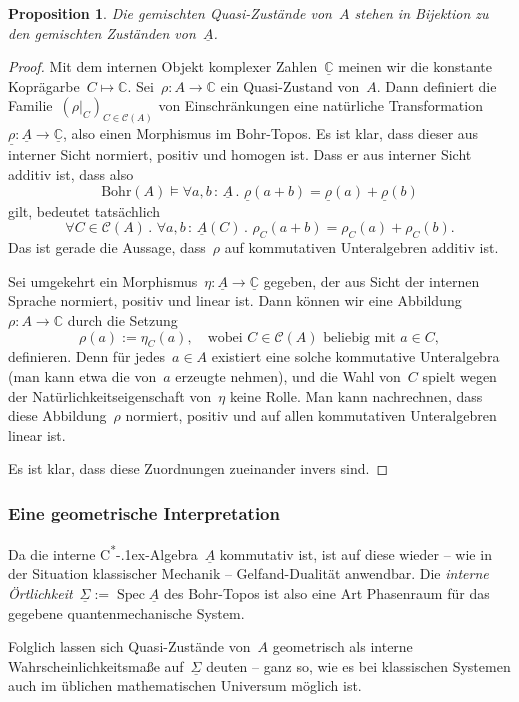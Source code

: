 \documentclass[a4paper,ngerman,12pt]{scrartcl}
\theoremstyle{definition}
\theoremstyle{plain}
\newtheorem{prop}[defn]{Proposition}
\theoremstyle{remark}
\newcommand{\CC}{\mathbb{C}}
\newcommand{\C}{\mathcal{C}}
\newcommand{\Bohr}{\mathrm{Bohr}}
\newcommand{\ul}[1]{\underline{#1}}
\newcommand{\csalgebra}{C\textsuperscript{*}\kern-.1ex-Algebra}
\DeclareMathOperator{\Spec}{Spec}
\renewcommand{\_}{\mathpunct{.}\,}
\newcommand{\?}{\,{:}\,}
\begin{document}
\begin{prop}Die gemischten Quasi-Zustände von~$A$ stehen in Bijektion zu den
gemischten Zuständen von~$\ul{A}$.\end{prop}
\begin{proof}Mit dem internen Objekt komplexer Zahlen~$\ul{\CC}$ meinen wir die
konstante Koprägarbe~$C \mapsto \CC$. Sei~$\rho : A \to \CC$ ein Quasi-Zustand
von~$A$. Dann definiert die Familie~$(\rho|_C)_{C \in \C(A)}$ von
Einschränkungen eine natürliche Transformation~$\ul{\rho} : \ul{A} \to
\ul{\CC}$, also einen Morphismus im Bohr-Topos. Es ist klar, dass dieser aus
interner Sicht normiert, positiv und homogen ist. Dass er aus interner Sicht
additiv ist, dass also
\[ \Bohr(A) \models \forall a,b\?\ul{A}\_ \ul{\rho}(a+b) = \ul{\rho}(a) +
\ul{\rho}(b) \]
gilt, bedeutet tatsächlich
\[ \forall C \in \C(A)\_ \forall a,b\?\ul{A}(C)\_ \rho_C(a+b) = \rho_C(a) +
\rho_C(b). \]
Das ist gerade die Aussage, dass~$\rho$ auf kommutativen Unteralgebren additiv
ist.

Sei umgekehrt ein Morphismus~$\eta : \ul{A} \to \ul{\CC}$ gegeben, der aus
Sicht der internen Sprache normiert, positiv und linear ist. Dann können wir
eine Abbildung~$\rho : A \to \CC$ durch die Setzung
\[ \rho(a) := \eta_C(a), \quad\text{wobei~$C \in \C(A)$ beliebig mit~$a \in
C$}, \]
definieren. Denn für jedes~$a \in A$ existiert eine solche kommutative Unteralgebra (man kann
etwa die von~$a$ erzeugte nehmen), und die Wahl von~$C$ spielt wegen der
Natürlichkeitseigenschaft von~$\eta$ keine Rolle. Man kann nachrechnen, dass
diese Abbildung~$\rho$ normiert, positiv und auf allen kommutativen
Unteralgebren linear ist.

Es ist klar, dass diese Zuordnungen zueinander invers sind.\end{proof}


\subsubsection*{Eine geometrische Interpretation}

Da die interne \csalgebra~$\ul{A}$ kommutativ ist, ist auf diese wieder -- wie
in der Situation klassischer Mechanik -- Gelfand-Dualität anwendbar. Die
\emph{interne Örtlichkeit}~$\ul{\Sigma} := \Spec \ul{A}$ des Bohr-Topos ist
also eine Art Phasenraum für das gegebene quantenmechanische System.

Folglich lassen sich Quasi-Zustände von~$A$ geometrisch als interne
Wahrscheinlichkeitsmaße auf~$\ul{\Sigma}$ deuten -- ganz so, wie es bei
klassischen Systemen auch im üblichen mathematischen Universum möglich ist.
\end{document}
